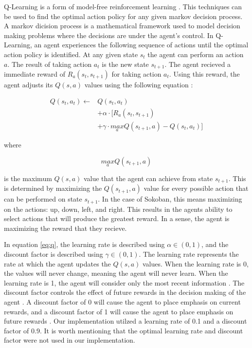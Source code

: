 \documentclass[times, 10pt,twocolumn]{article}
\begin{document}
Q-Learning is a form of model-free reinforcement learning \cite{Watkins1992}. This techniques can be used to find the optimal action policy for any given markov decision process. A markov dicision process is a mathematical framework used to model decision making problems where the decisions are under the agent's control. In Q-Learning, an agent experiences the following sequence of actions until the optimal action policy is identified. At any given state $s_t$ the agent can perform an action $a$. The result of taking action $a_t$ is the new state $s_{t+1}$. The agent recieved a immediate reward of $R_a(s_t, s_{t+1})$ for taking action $a_t$. Using this reward, the agent adjusts its $Q(s, a)$ values using the following equation \cite{Watkins1992}:

\begin{equation}
\label{eq:q}
\begin{split}
Q(s_t, a_t) \gets &Q(s_t, a_t) \\
                  &+ \alpha \cdot [R_a(s_t, s_{t+1}) \\
                  &+ \gamma \cdot \underset{a}{max}Q(s_{t+1}, a) - Q(s_t, a_t)]
\end{split}
\end{equation}

where 

\begin{equation}
\underset{a}{max}Q(s_{t+1}, a)
\end{equation}

is the maximum $Q(s, a)$ value that the agent can achieve from state $s_{t+1}$. This is determined by maximizing the $Q(s_{t+1}, a)$ value for every possible action that can be performed on state $s_{t+1}$. In the case of Sokoban, this means maximizing on the actions: up, down, left, and right. This results in the agents ability to select actions that will produce the greatest reward. In a sense, the agent is maximizing the reward that they recieve. 

In equation \ref{eq:q}, the learning rate is described using $\alpha \in (0, 1)$, and the discount factor is described using $\gamma \in (0, 1)$. The learning rate represents the rate at which the agent updates the $Q(s, a)$ values. When the learning rate is 0, the values will never change, meaning the agent will never learn. When the learning rate is 1, the agent will consider only the most recent information \cite{Littman94markovgames}. The discount factor controls the effect of future rewards in the decision making of the agent \cite{Littman94markovgames}. A discount factor of 0 will cause the agent to place emphasis on current rewards, and a discount factor of 1 will cause the agent to place emphasis on future rewards \cite{Littman94markovgames}. Our implementation utilzed a learning rate of 0.1 and a discount factor of 0.9. It is worth mentioning that the optimal learning rate and discount factor were not used in our implementation.
\end{document}
